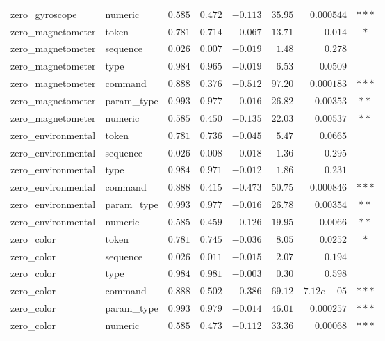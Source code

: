 \begin{table}[h]
\begin{tabular}{l l r r r r r c}
zero\_gyroscope & numeric & $0.585$ & $0.472$ & $-0.113$ & $35.95$ & $0.000544$ & $\ast\ast\ast$ \\
zero\_magnetometer & token & $0.781$ & $0.714$ & $-0.067$ & $13.71$ & $0.014$ & $\ast$ \\
zero\_magnetometer & sequence & $0.026$ & $0.007$ & $-0.019$ & $1.48$ & $0.278$ &  \\
zero\_magnetometer & type & $0.984$ & $0.965$ & $-0.019$ & $6.53$ & $0.0509$ &  \\
zero\_magnetometer & command & $0.888$ & $0.376$ & $-0.512$ & $97.20$ & $0.000183$ & $\ast\ast\ast$ \\
zero\_magnetometer & param\_type & $0.993$ & $0.977$ & $-0.016$ & $26.82$ & $0.00353$ & $\ast\ast$ \\
zero\_magnetometer & numeric & $0.585$ & $0.450$ & $-0.135$ & $22.03$ & $0.00537$ & $\ast\ast$ \\
zero\_environmental & token & $0.781$ & $0.736$ & $-0.045$ & $5.47$ & $0.0665$ &  \\
zero\_environmental & sequence & $0.026$ & $0.008$ & $-0.018$ & $1.36$ & $0.295$ &  \\
zero\_environmental & type & $0.984$ & $0.971$ & $-0.012$ & $1.86$ & $0.231$ &  \\
zero\_environmental & command & $0.888$ & $0.415$ & $-0.473$ & $50.75$ & $0.000846$ & $\ast\ast\ast$ \\
zero\_environmental & param\_type & $0.993$ & $0.977$ & $-0.016$ & $26.78$ & $0.00354$ & $\ast\ast$ \\
zero\_environmental & numeric & $0.585$ & $0.459$ & $-0.126$ & $19.95$ & $0.0066$ & $\ast\ast$ \\
zero\_color & token & $0.781$ & $0.745$ & $-0.036$ & $8.05$ & $0.0252$ & $\ast$ \\
zero\_color & sequence & $0.026$ & $0.011$ & $-0.015$ & $2.07$ & $0.194$ &  \\
zero\_color & type & $0.984$ & $0.981$ & $-0.003$ & $0.30$ & $0.598$ &  \\
zero\_color & command & $0.888$ & $0.502$ & $-0.386$ & $69.12$ & $7.12e-05$ & $\ast\ast\ast$ \\
zero\_color & param\_type & $0.993$ & $0.979$ & $-0.014$ & $46.01$ & $0.000257$ & $\ast\ast\ast$ \\
zero\_color & numeric & $0.585$ & $0.473$ & $-0.112$ & $33.36$ & $0.00068$ & $\ast\ast\ast$ \\
\bottomrule
\end{tabular}
\end{table}